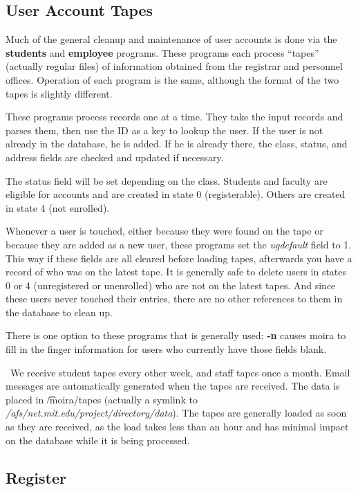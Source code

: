 \subsection{User Account Tapes}

Much of the general cleanup and maintenance of user accounts is done
via the {\bf students} and {\bf employee} programs.  These programs
each process ``tapes'' (actually regular files) of information
obtained from the registrar and personnel offices.  Operation of each
program is the same, although the format of the two tapes is slightly
different.

These programs process records one at a time.  They take the input
records and parses them, then use the ID as a key to lookup the user.
If the user is not already in the database, he is added.  If he is
already there, the class, status, and address fields are checked and
updated if necessary.

The status field will be set depending on the class.  Students and
faculty are eligible for accounts and are created in state 0
(registerable).  Others are created in state 4 (not enrolled).

Whenever a user is touched, either because they were found on the tape
or because they are added as a new user, these programs set the
{\em ugdefault} field to 1.  This way if these fields are all cleared
before loading tapes, afterwards you have a record of who was on the
latest tape.  It is generally safe to delete users in states 0 or 4
(unregistered or unenrolled) who are not on the latest tapes.  And
since these users never touched their entries, there are no other
references to them in the database to clean up.

There is one option to these programs that is generally used:
{\bf -n} causes moira to fill in the finger information for users who
currently have those fields blank.

\athena\ We receive student tapes every other week, and staff tapes
once a month.  Email messages are automatically generated when the
tapes are received.  The data is placed in {\t /moira/tapes} (actually
a symlink to {\it /afs/net.mit.edu/project/directory/data}).  The
tapes are generally loaded as soon as they are received, as the load
takes less than an hour and has minimal impact on the database while
it is being processed.

\subsection{Register}

